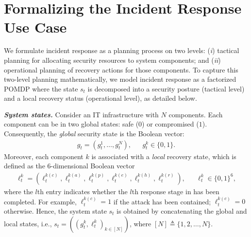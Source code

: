 \documentclass[sigconf]{acmart}
\begin{document}
\section{Formalizing the Incident Response Use Case}\label{sec:system_model}
We formulate incident response as a planning process on two levels: (\textit{i}) tactical planning for allocating security resources to system components; and (\textit{ii}) operational planning of recovery actions for those components. To capture this two-level planning mathematically, we model incident response as a factorized POMDP where the state $s_t$ is decomposed into a security posture (tactical level) and a local recovery status (operational level), as detailed below.

\vspace{2.5mm}
\noindent\textit{\textbf{System states.}}
Consider an IT infrastructure with $N$ components. Each component can be in two global states: safe ($0$) or compromised ($1$). Consequently, the \textit{global} security state is the Boolean vector:
\begin{align*}
g_t=(g^1_t, \ldots, g_t^N), && g^k_t\in \{0, 1\}.
\end{align*}  
Moreover, each component $k$ is associated with a \textit{local} recovery state, which is defined as the 6-dimensional Boolean vector
\begin{align*}
\ell^k_t=(\ell^{k(c)}_t, \ell^{k(a)}_t, \ell^{k(p)}_t, \ell^{k(e)}_t, \ell^{k(h)}_t, \ell^{k(r)}_t), && \ell^k_t\in \{0, 1\}^6,
\end{align*}
where the $l$th entry indicates whether the $l$th response stage in  has been completed. For example, $\ell^{k(c)}_t=1$ if the attack has been contained; $\ell^{k(c)}_t=0$ otherwise. Hence, the system state $s_t$ is obtained by concatenating the global and local states, i.e., $s_t=((g_t^k,\ell_t^k)_{k\in [N]})$, where $[N] \triangleq \{1,2,\ldots, N\}$.
\end{document}
